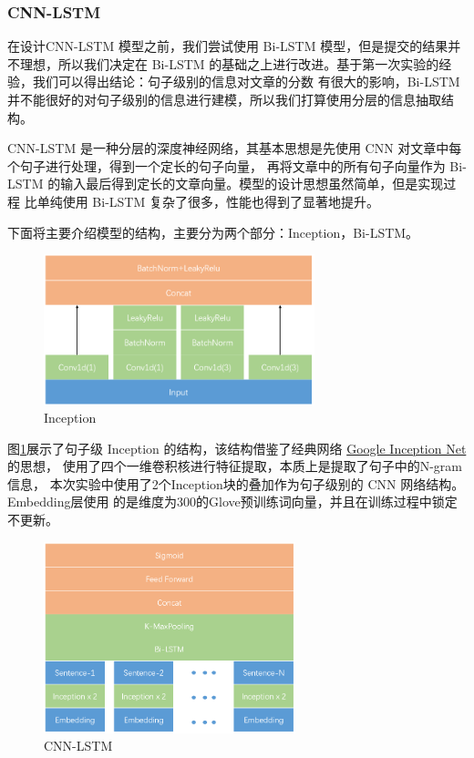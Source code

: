 \documentclass[UTF8]{article}
\begin{document}
\subsubsection{CNN-LSTM}

在设计CNN-LSTM 模型之前，我们尝试使用 Bi-LSTM 模型，但是提交的结果并不理想，所以我们决定在
Bi-LSTM 的基础之上进行改进。基于第一次实验的经验，我们可以得出结论：句子级别的信息对文章的分数
有很大的影响，Bi-LSTM 并不能很好的对句子级别的信息进行建模，所以我们打算使用分层的信息抽取结构。

CNN-LSTM 是一种分层的深度神经网络，其基本思想是先使用 CNN 对文章中每个句子进行处理，得到一个定长的句子向量，
再将文章中的所有句子向量作为 Bi-LSTM 的输入最后得到定长的文章向量。模型的设计思想虽然简单，但是实现过程
比单纯使用 Bi-LSTM 复杂了很多，性能也得到了显著地提升。

下面将主要介绍模型的结构，主要分为两个部分：Inception，Bi-LSTM。

\begin{figure}[h]
    \centering
    \includegraphics[width=0.7\textwidth]{fig/1.png}
    \caption{Inception}
    \label{fig:Inception}
\end{figure}

图\ref{fig:Inception}展示了句子级 Inception 的结构，该结构借鉴了经典网络
\href{https://arxiv.org/pdf/1512.00567.pdf}{Google Inception Net}的思想，
使用了四个一维卷积核进行特征提取，本质上是提取了句子中的N-gram信息，
本次实验中使用了2个Inception块的叠加作为句子级别的 CNN 网络结构。Embedding层使用
的是维度为300的Glove预训练词向量，并且在训练过程中锁定不更新。

\begin{figure}[h]
    \centering
    \includegraphics[width=0.65\textwidth]{fig/2.png}
    \caption{CNN-LSTM}
    \label{fig:CNN-LSTM}
\end{figure}
\end{document}

